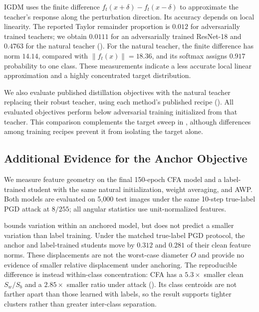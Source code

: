 IGDM \citep{igdm} uses the finite difference $f_t(x+\delta)-f_t(x-\delta)$ to approximate the
teacher's response along the perturbation direction. Its accuracy depends on local linearity.
The reported Taylor remainder proportion is $0.012$ for adversarially trained teachers; we obtain
$0.0111$ for an adversarially trained ResNet-18 and $0.4763$ for the natural teacher
(). For the natural teacher, the finite difference has norm $14.14$, compared
with $\lVert f_t(x)\rVert=18.36$, and its softmax assigns $0.917$ probability to one class.
These measurements indicate a less accurate local linear approximation and a highly concentrated
target distribution.

We also evaluate published distillation objectives with the natural teacher replacing their robust
teacher, using each method's published recipe (). All evaluated objectives
perform below adversarial training initialized from that teacher. This comparison complements the
target sweep in , although differences among training recipes prevent it from
isolating the target alone.

\subsection{Additional Evidence for the Anchor Objective}
\label{app:anchor_measurements}
\label{sec:empirical_geometry}

We measure feature geometry on the final 150-epoch CFA model and a label-trained student with the
same natural initialization, weight averaging, and AWP. Both models are evaluated on 5,000 test
images under the same 10-step true-label PGD attack at $8/255$; all angular statistics use
unit-normalized features.

 bounds variation within an anchored model, but does not predict a smaller
variation than label training. Under the matched true-label PGD protocol, the anchor and
label-trained students move by $0.312$ and $0.281$ of their clean feature norms. These
displacements are not the worst-case diameter $O$ and provide no evidence of smaller relative
displacement under anchoring. The reproducible difference is instead within-class concentration:
CFA has a $5.3\times$ smaller clean $S_w/S_b$ and a $2.85\times$ smaller ratio under attack
(). Its class centroids are not farther apart than those learned with labels,
so the result supports tighter clusters rather than greater inter-class separation.

